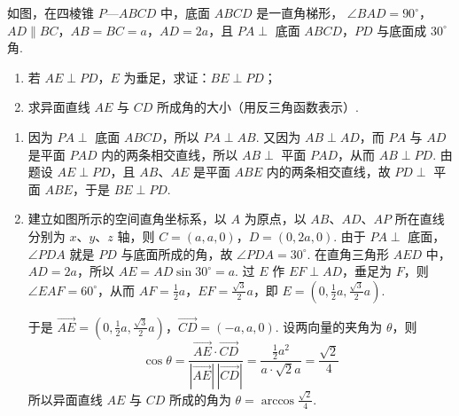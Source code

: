 \documentclass[UTF8,a4paper,oneside,11pt]{ctexbook}
\begin{document}
\begin{problem}
如图，在四棱锥 \(P\)—\(ABCD\) 中，底面 \(ABCD\) 是一直角梯形， \(\angle BAD = 90^{\circ} \)，\(AD \parallel BC\)，\(AB = BC = a\)，\(AD = 2a\)，且 \(PA \perp \) 底面 \(ABCD\)，\(PD\) 与底面成 \(30^{\circ} \) 角.

\begin{enumerate}
\item 若 \(AE \perp PD\)，\(E\) 为垂足，求证：\(BE \perp PD\)；
\item 求异面直线 \(AE\) 与 \(CD\) 所成角的大小（用反三角函数表示）.
\end{enumerate}

\end{problem}

\begin{solution}
\begin{enumerate}
\item 因为 \(PA\perp\) 底面 \(ABCD\)，所以 \(PA\perp AB\). 又因为 \(AB\perp AD\)，而 \(PA\) 与 \(AD\) 是平面 \(PAD\) 内的两条相交直线，所以 \(AB\perp\) 平面 \(PAD\)，从而 \(AB\perp PD\). 由题设 \(AE\perp PD\)，且 \(AB\)、\(AE\) 是平面 \(ABE\) 内的两条相交直线，故 \(PD\perp\) 平面 \(ABE\)，于是 \(BE\perp PD\).

\item 建立如图所示的空间直角坐标系，以 \(A\) 为原点，以 \(AB\)、\(AD\)、\(AP\) 所在直线分别为 \(x\)、\(y\)、\(z\) 轴，则 \(C=(a,a,0)\)，\(D=(0,2a,0)\). 由于 \(PA\perp\) 底面，\(\angle PDA\) 就是 \(PD\) 与底面所成的角，故 \(\angle PDA=30^{\circ}\). 在直角三角形 \(AED\) 中，\(AD=2a\)，所以 \(AE=AD\sin30^{\circ}=a\). 过 \(E\) 作 \(EF\perp AD\)，垂足为 \(F\)，则 \(\angle EAF=60^{\circ}\)，从而 \(AF=\frac12a\)，\(EF=\frac{\sqrt3}{2}a\)，即 \(E=\left(0,\frac12a,\frac{\sqrt3}{2}a\right)\).

于是 \(\overrightarrow{AE}=\left(0,\frac12a,\frac{\sqrt3}{2}a\right)\)，\(\overrightarrow{CD}=(-a,a,0)\). 设两向量的夹角为 \(\theta\)，则
\[
\cos\theta=\frac{\overrightarrow{AE}\cdot\overrightarrow{CD}}{|\overrightarrow{AE}|\,|\overrightarrow{CD}|}=\frac{\frac12a^2}{a\cdot\sqrt2a}=\frac{\sqrt2}{4}
\]
所以异面直线 \(AE\) 与 \(CD\) 所成的角为 \(\theta=\arccos\frac{\sqrt2}{4}\).
\end{enumerate}
\end{solution}
\end{document}
